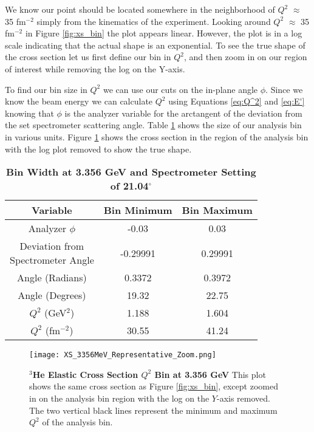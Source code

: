We know our point should be located somewhere in the neighborhood of $Q^2$ $\approx$ 35 fm$^{-2}$ simply from the kinematics of the experiment. Looking around $Q^2$ $\approx$ 35 fm$^{-2}$ in Figure \ref{fig:xs_bin} the plot appears linear. However, the plot is in a log scale indicating that the actual shape is an exponential. To see the true shape of the cross section let us first define our bin in $Q^2$, and then zoom in on our region of interest while removing the log on the Y-axis. 

To find our bin size in $Q^2$ we can use our cuts on the in-plane angle $\phi$. Since we know the beam energy we can calculate $Q^2$ using Equations \ref{eq:Q^2} and \ref{eq:E'} knowing that $\phi$ is the analyzer variable for the arctangent of the deviation from the set spectrometer scattering angle. Table \ref{tab:bin} shows the size of our analysis bin in various units. Figure \ref{fig:xs_bin_zoom} shows the cross section in the region of the analysis bin with the log plot removed to show the true shape.

\vspace{5mm}

\begin{table}[!h]
\centering
\begin{tabular}{|c | c c |}
\hline
\textbf{Variable} & \textbf{Bin Minimum} & \textbf{Bin Maximum}\\
\hline
Analyzer $\phi$ & -0.03 & 0.03\\ 
\makecell{Deviation from \\ Spectrometer Angle} & -0.29991 & 0.29991\\
Angle (Radians) & 0.3372 &  0.3972\\
Angle (Degrees) & 19.32 & 22.75\\
$Q^2$ (GeV$^2$) & 1.188 & 1.604\\
$Q^2$ (fm$^{-2}$) & 30.55 & 41.24\\
\hline
\end{tabular}
\caption[Bin Width at 3.356 GeV and Spectrometer Setting of 21.04$^\circ$]{{\bf{Bin Width at 3.356 GeV and Spectrometer Setting of 21.04$^\circ$}} }
\label{tab:bin}
\end{table}

\begin{figure}[!ht]
\begin{center}
\texttt{[image: XS\_3356MeV\_Representative\_Zoom.png]}
\end{center}
\caption[$^3$He Elastic Cross Section $Q^2$ Bin at $E_0$ 3.356 GeV]{
{\bf{$^3$He Elastic Cross Section $Q^2$ Bin at 3.356 GeV}} This plot shows the same cross section as Figure \ref{fig:xs_bin}, except zoomed in on the analysis bin region with the log on the $Y$-axis removed. The two vertical black lines represent the minimum and maximum $Q^2$ of the analysis bin.}
\label{fig:xs_bin_zoom}
\end{figure}

